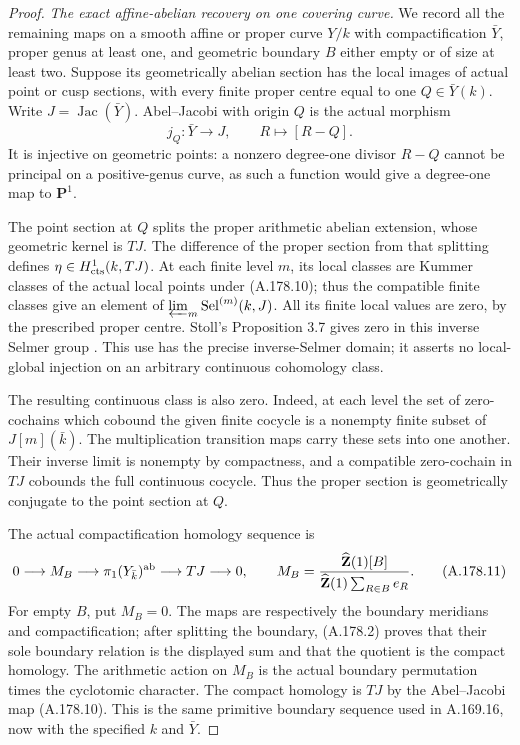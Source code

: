 \begin{proof}
\emph{The exact affine-abelian recovery on one covering curve.}
We record all the remaining maps on a smooth affine or proper
curve \(Y/k\) with compactification \(\bar Y\), proper genus at
least one, and geometric boundary \(B\) either empty or of
size at least two.  Suppose its geometrically abelian section
has the local images of actual point or cusp sections, with
every finite proper centre equal to one \(Q\in\bar Y(k)\).
Write \(J=\operatorname{Jac}(\bar Y)\).  Abel--Jacobi with
origin \(Q\) is the actual morphism
\[
              j_Q:\bar Y\longrightarrow J,\qquad
                          R\longmapsto[R-Q].
\tag{A.178.10}
\]
It is injective on geometric points: a nonzero degree-one
divisor \(R-Q\) cannot be principal on a positive-genus curve,
as such a function would give a degree-one map to
\(\mathbf P^1\).

The point section at \(Q\) splits the proper arithmetic
abelian extension, whose geometric kernel is \(TJ\).
The difference of the proper section from that splitting
defines \(\eta\in H^1_{\rm cts}(k,TJ)\).
At each finite level \(m\), its local classes are Kummer
classes of the actual local points under (A.178.10);
thus the compatible finite classes give an element of
\(\varprojlim_m\operatorname{Sel}^{(m)}(k,J)\).
All its finite local values are zero, by the prescribed
proper centre.  Stoll's Proposition 3.7 gives zero in this
inverse Selmer group
\cite[Proposition 3.7, p.~10 of the author version]{LegStoll2007}.
This use has the precise inverse-Selmer domain; it asserts no
local-global injection on an arbitrary continuous cohomology
class.

The resulting continuous class is also zero.  Indeed, at each
level the set of zero-cochains which cobound the given finite
cocycle is a nonempty finite subset of \(J[m](\bar k)\).
The multiplication transition maps carry these sets into one
another.  Their inverse limit is nonempty by compactness,
and a compatible zero-cochain in \(TJ\) cobounds the full
continuous cocycle.  Thus the proper section is geometrically
conjugate to the point section at \(Q\).

The actual compactification homology sequence is
\[
 0\longrightarrow M_B\longrightarrow
             \pi_1(Y_{\bar k})^{\rm ab}
       \longrightarrow TJ\longrightarrow0,\qquad
 M_B=
 \frac{\widehat{\mathbf Z}(1)[B]}
      {\widehat{\mathbf Z}(1)\sum_{R\in B}e_R}.
\tag{A.178.11}
\]
For empty \(B\), put \(M_B=0\).  The maps are respectively
the boundary meridians and compactification; after splitting
the boundary, (A.178.2) proves that their sole boundary
relation is the displayed sum and that the quotient is the
compact homology.  The arithmetic action on \(M_B\) is the
actual boundary permutation times the cyclotomic character.
The compact homology is \(TJ\) by the Abel--Jacobi map
(A.178.10).  This is the same primitive boundary sequence
used in A.169.16, now with the specified \(k\) and \(\bar Y\).


\end{proof}
